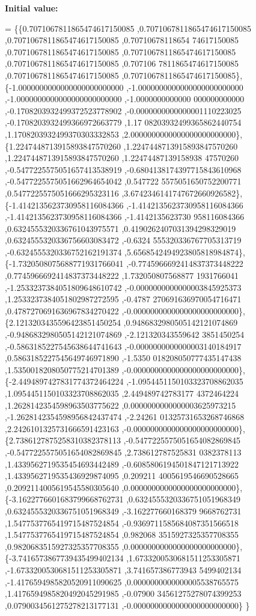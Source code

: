 {\bfseries Initial value\+:}
\begin{DoxyCode}
= \{\{0.7071067811865474617150085 ,0.7071067811865474617150085 ,0.7071067811865474617150085 ,0.70710678118654
      74617150085 ,0.7071067811865474617150085 ,0.7071067811865474617150085 ,0.7071067811865474617150085 ,0.707106
      7811865474617150085 ,0.7071067811865474617150085 ,0.7071067811865474617150085\},
\{-1.0000000000000000000000000 ,-1.0000000000000000000000000 ,-1.0000000000000000000000000 ,-1.0000000000000
      000000000000 ,-0.1708203932499372523778902 ,-0.0000000000000001110223025 ,-0.1708203932499366972663779 ,1.17
      08203932499365862440754 ,1.1708203932499370303332853 ,2.0000000000000000000000000\},
\{1.2247448713915893847570260 ,1.2247448713915893847570260 ,1.2247448713915893847570260 ,1.22474487139158938
      47570260 ,-0.5477225575051657413538919 ,-0.6804138174397715843610968 ,-0.5477225575051662964654042 ,0.547722
      5575051650752200771 ,0.5477225575051666295323116 ,3.6742346141747672660926582\},
\{-1.4142135623730958116084366 ,-1.4142135623730958116084366 ,-1.4142135623730958116084366 ,-1.4142135623730
      958116084366 ,0.6324555320336761043975571 ,0.4190262407031394298329019 ,0.6324555320336756603083472 ,-0.6324
      555320336767705313719 ,-0.6324555320336752162191374 ,5.6568542494923805818984874\},
\{-1.7320508075688771931766041 ,-0.7745966692414837373448222 ,0.7745966692414837373448222 ,1.732050807568877
      1931766041 ,-1.2533237384051809648610742 ,-0.0000000000000003845925373 ,1.2533237384051802987272595 ,-0.4787
      270691636970054716471 ,0.4787270691636967834270422 ,-0.0000000000000000000000000\},
\{2.1213203435596423851450254 ,0.9486832980505142121074869 ,-0.9486832980505142121074869 ,-2.121320343559642
      3851450254 ,-0.5863185227545638644741643 ,-0.0000000000000003140184917 ,0.5863185227545649746971890 ,-1.5350
      018208050777435147438 ,1.5350018208050775214701389 ,-0.0000000000000000000000000\},
\{-2.4494897427831774372464224 ,-1.0954451150103323708862035 ,1.0954451150103323708862035 ,2.449489742783177
      4372464224 ,1.2628142354598963503775622 ,0.0000000000000003625973215 ,-1.2628142354598956842437474 ,-2.24261
      01325731653268746868 ,2.2426101325731666591423163 ,-0.0000000000000000000000000\},
\{2.7386127875258310382378113 ,-0.5477225575051654082869845 ,-0.5477225575051654082869845 ,2.738612787525831
      0382378113 ,1.4339562719535454693442489 ,-0.6085806194501847121713922 ,1.4339562719535436929874095 ,0.209211
      4005619546690528665 ,0.2092114005619545580305640 ,0.0000000000000000000000000\},
\{-3.1622776601683799668762731 ,0.6324555320336751051968349 ,0.6324555320336751051968349 ,-3.162277660168379
      9668762731 ,1.5477537765419715487524854 ,-0.9369711585684087351566518 ,1.5477537765419715487524854 ,0.982068
      3515927325357708355 ,0.9820683515927325357708355 ,0.0000000000000000000000000\},
\{-3.7416573867739435499402134 ,1.6733200530681511253305871 ,-1.6733200530681511253305871 ,3.741657386773943
      5499402134 ,-1.4176594985820520911090625 ,0.0000000000000005538765575 ,1.4176594985820492045291985 ,-0.07900
      34561275278074399253 ,0.0790034561275278213177131 ,-0.0000000000000000000000000\}
\}
\end{DoxyCode}
